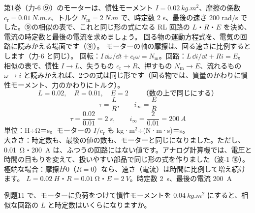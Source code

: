 \label{ph:電-9:ex11}
\begin{phreidai}
第1巻（力-6 ⑨）のモーターは、慣性モーメント $I=\qty{0.02}{kg.m^2}$、摩擦の係数 $c_{\mathrm r}=\qty{0.01}{N.m.s}$、トルク $N_{\mathrm m}=\qty{2}{N.m}$ で、時定数 2 s、最後の速さ 200 rad/s でした。⑨の相似の表で、これと同じ形の式になる RL 回路の $L$・$R$・$E$ を決め、電流の時定数と最後の電流を求めましょう。
\phbamen
回る物の運動方程式を、電気の回路に読みかえる場面です（⑨）。
\phmushi
モーターの軸の摩擦は、回る速さに比例するとします（力-6 と同じ）。
\phzu
回転：$I\,\dd\omega/\dd t+c_{\mathrm r}\omega=N_{\mathrm m}$。回路：$L\,\dd i/\dd t+Ri=E$。
\phriyu
相似の表で、慣性 $I\to L$、失うもの $c_{\mathrm r}\to R$、押すもの $N_{\mathrm m}\to E$、流れるもの $\omega\to i$ と読みかえれば、2つの式は同じ形です（回る物では、質量のかわりに慣性モーメント、力のかわりにトルク）。
\phtateru
\[ L=0.02,\quad R=0.01,\quad E=2\qquad\text{（数の上で同じにする）} \]
\[ \tau=\frac{L}{R},\qquad i_\infty=\frac{E}{R} \]
\phtoku
\[ \tau=\frac{0.02}{0.01}=\qty{2}{s},\qquad i_\infty=\frac{2}{0.01}=\qty{200}{A} \]
\phtashikame
単位：H÷Ω＝s。モーターの $I/c_{\mathrm r}$ も kg·m$^2$÷(N·m·s)＝s。\\
大きさ：時定数も、最後の値の数も、モーターと同じになりました。ただし、\qty{0.01}{\ohm}・\qty{200}{A} は、ふつうの回路にはない値です。アナログ計算機では、電圧と時間の目もりを変えて、扱いやすい部品で同じ形の式を作りました（波-1 ⑩）。\\
極端な場合：摩擦が0（$R=0$）なら、速さ（電流）は時間に比例して増え続けます。
\kotae $L=\qty{0.02}{H}$・$R=\qty{0.01}{\ohm}$・$E=\qty{2}{V}$。時定数 \qty{2}{s}、最後の電流 \qty{200}{A}
\end{phreidai}
\begin{jibun}
例題11 で、モーターに負荷をつけて慣性モーメントを $\qty{0.04}{kg.m^2}$ にすると、相似な回路の $L$ と時定数はいくらになりますか。
\end{jibun}

